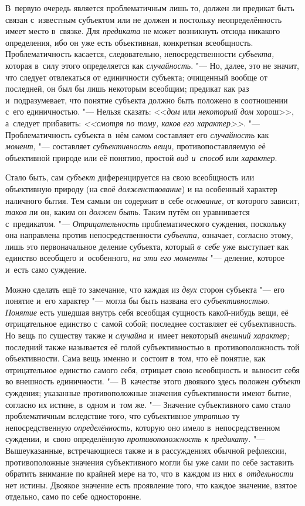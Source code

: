 \label{bkm:bm66a}В~первую очередь является проблематичным лишь
то, должен ли предикат быть связан с~известным субъектом или не должен и
постольку неопределённость имеет место в~связке. Для {\em предиката} не может
возникнуть отсюда никакого определения, ибо он уже есть объективная,
конкретная всеобщность. Проблематичность касается, следовательно,
непосредственности {\em субъекта,} которая в~силу этого определяется как
{\em случайность}. "--- Но,
далее, это не значит, что следует отвлекаться от единичности субъекта;
очищенный вообще от последней, он был бы лишь некоторым всеобщим; предикат
как раз и~подразумевает, что понятие субъекта должно быть положено в
соотношении с~его единичностью. "--- Нельзя сказать: <<{\em дом} или
{\em некоторый дом} хорош>>, а~следует прибавить: {\em <<смотря по тому,
каков его характер>>.} "--- Проблематичность субъекта в~нём самом
составляет его {\em случайность} как {\em момент,} "--- составляет
{\em субъективность вещи,} противопоставляемую её объективной природе
или её понятию, простой {\em вид и~способ} или {\em характер}.

Стало быть, сам {\em субъект} диференцируется на свою всеобщность или
объективную природу (на своё {\em долженствование})
и на особенный характер наличного бытия. Тем самым он
содержит в~себе {\em основание,} от которого зависит, {\em таков} ли он,
каким он {\em должен быть}. Таким путём он уравнивается
с~предикатом. "--- {\em Отрицательность} проблематического суждения,
поскольку она направлена против непосредственности {\em субъекта,}
означает, согласно этому, лишь это первоначальное деление субъекта,
который {\em в~себе} уже выступает как единство всеобщего и~особенного,
{\em на эти его моменты} "--- деление, которое и~есть само суждение.

Можно сделать ещё то замечание, что каждая из {\em двух} сторон
субъекта "--- его понятие и~его характер "--- могла бы быть названа его
{\em субъективностью}. \label{bkm:bm01a}{\em Понятие}
есть ушедшая внутрь себя всеобщая сущность какой-нибудь вещи,
её отрицательное единство с~самой собой; последнее составляет её
субъективность. Но вещь по существу также и {\em случайна} и~имеет некоторый
{\em внешний характер;} последний также называется её голой субъективностью
в~противоположность той объективности. Сама вещь именно и~состоит в~том, что
её понятие, как отрицательное единство самого себя, отрицает свою
всеобщность и~выносит себя во внешность
единичности. "--- В~качестве этого двоякого здесь положен {\em субъект}
суждения; указанные противоположные значения субъективности имеют бытие,
согласно их истине, в~одном и~том же. "--- Значение субъективного само
стало проблематичным вследствие того, что субъективное {\em утратило} ту
непосредственную {\em определённость,} которую оно имело в~непосредственном
суждении, и~свою определённую {\em противоположность к
предикату}. "--- Вышеуказанные, встречающиеся также и
в рассуждениях обычной рефлексии, противоположные значения субъективного
могли бы уже сами по себе заставить обратить внимание по крайней мере на
то, что в~каждом из них {\em в~отдельности} нет истины. Двоякое значение
есть проявление того, что каждое значение, взятое отдельно, само по себе
односторонне.


